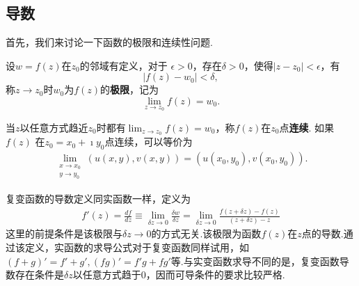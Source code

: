 \subsection{导数}

首先，我们来讨论一下函数的极限和连续性问题.
\begin{Definition}
    设$w=f(z)$在$z_0$的邻域有定义，对于
$\epsilon > 0$，存在$\delta > 0$，使得$|z-z_0| < \epsilon$，有
\begin{equation}
    |f(z) - w_0| < \delta ,
\end{equation}
称$z\to z_0$时$w_0$为$f(z)$的{\bf 极限}，记为
\begin{equation}
    \lim_{z\to z_0} f(z) = w_0 .
\end{equation}
\end{Definition}
当$z$以任意方式趋近$z_0$时都有$ \lim_{z\to z_0} f(z) = w_0$，称$f(z)$在$z_0$点{\bf 连续}.
如果$f(z)$ 在$z_0=x_0 + \imath y_0$点连续，可以等价为
\begin{align}
    \lim_{\substack{x\to x_0\\y\to y_0}} \left(u(x,y), v(x,y)\right) = \left(u(x_0, y_0), v(x_0, y_0)\right) . 
\end{align}

复变函数的导数定义同实函数一样，定义为
\begin{align}
    \label{eq:derivative_def}
    f'(z) = \frac{df}{dz} 
    \equiv\lim_{\delta z \to 0} \frac{\delta w} {\delta z} 
    = \lim_{\delta z\to 0} \frac{f(z+\delta z) - f(z) } {(z+\delta z ) - z}
\end{align}
这里的前提条件是该极限与$\delta z \to 0$的方式无关.该极限为函数$f(z)$在$z$点的导数.通过该定义，实函数的求导公式对于复变函数同样试用，如
$(f+g)' = f' + g', (fg)' =f'g + fg'$等.与实变函数求导不同的是，复变函数导数存在条件是$\delta z$以任意方式趋于$0$，因而可导条件的要求比较严格.

